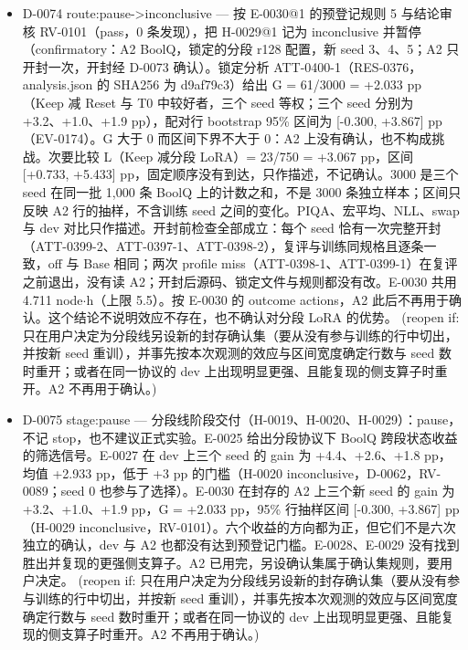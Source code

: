 \documentclass[11pt]{article}
\begin{document}
\begin{itemize}
node\ensuremath{\cdot}h；不计 profile miss 时，预计全程 4.877 node\ensuremath{\cdot}h；按剩余作业的申请墙钟算为 5.245 node\ensuremath{\cdot}h，余下约 0.25 node\ensuremath{\cdot}h（约 61 MIG 分钟）可用于 profile miss。
\item D-0074 route:pause-\textgreater{}inconclusive --- 按 E-0030@1 的预登记规则 5 与结论审核 RV-0101（pass，0 条发现），把 H-0029@1 记为 inconclusive 并暂停（confirmatory：A2 BoolQ，锁定的分段 r128 配置，新 seed 3、4、5；A2 只开封一次，开封经 D-0073 确认）。锁定分析 ATT-0400-1（RES-0376，analysis.json 的 SHA256 为 d9af79c3）给出 G = 61/3000 = +2.033 pp（Keep 减 Reset 与 T0 中较好者，三个 seed 等权；三个 seed 分别为 +3.2、+1.0、+1.9 pp），配对行 bootstrap 95\% 区间为 [-0.300, +3.867] pp（EV-0174）。G 大于 0 而区间下界不大于 0：A2 上没有确认，也不构成挑战。次要比较 L（Keep 减分段 LoRA）= 23/750 = +3.067 pp，区间 [+0.733, +5.433] pp，固定顺序没有到达，只作描述，不记确认。3000 是三个 seed 在同一批 1,000 条 BoolQ 上的计数之和，不是 3000 条独立样本；区间只反映 A2 行的抽样，不含训练 seed 之间的变化。PIQA、宏平均、NLL、swap 与 dev 对比只作描述。开封前检查全部成立：每个 seed 恰有一次完整开封（ATT-0399-2、ATT-0397-1、ATT-0398-2），复评与训练同规格且逐条一致，off 与 Base 相同；两次 profile miss（ATT-0398-1、ATT-0399-1）在复评之前退出，没有读 A2；开封后源码、锁定文件与规则都没有改。E-0030 共用 4.711 node\ensuremath{\cdot}h（上限 5.5）。按 E-0030 的 outcome actions，A2 此后不再用于确认。这个结论不说明效应不存在，也不确认对分段 LoRA 的优势。 (reopen if: 只在用户决定为分段线另设新的封存确认集（要从没有参与训练的行中切出，并按新 seed 重训），并事先按本次观测的效应与区间宽度确定行数与 seed 数时重开；或者在同一协议的 dev 上出现明显更强、且能复现的侧支算子时重开。A2 不再用于确认。)
\item D-0075 stage:pause --- 分段线阶段交付（H-0019、H-0020、H-0029）：pause，不记 stop，也不建议正式实验。E-0025 给出分段协议下 BoolQ 跨段状态收益的筛选信号。E-0027 在 dev 上三个 seed 的 gain 为 +4.4、+2.6、+1.8 pp，均值 +2.933 pp，低于 +3 pp 的门槛（H-0020 inconclusive，D-0062，RV-0089；seed 0 也参与了选择）。E-0030 在封存的 A2 上三个新 seed 的 gain 为 +3.2、+1.0、+1.9 pp，G = +2.033 pp，95\% 行抽样区间 [-0.300, +3.867] pp（H-0029 inconclusive，RV-0101）。六个收益的方向都为正，但它们不是六次独立的确认，dev 与 A2 也都没有达到预登记门槛。E-0028、E-0029 没有找到胜出并复现的更强侧支算子。A2 已用完，另设确认集属于确认集规则，要用户决定。 (reopen if: 只在用户决定为分段线另设新的封存确认集（要从没有参与训练的行中切出，并按新 seed 重训），并事先按本次观测的效应与区间宽度确定行数与 seed 数时重开；或者在同一协议的 dev 上出现明显更强、且能复现的侧支算子时重开。A2 不再用于确认。)

\end{itemize}
\end{document}
